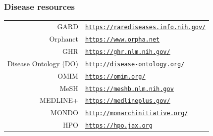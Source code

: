 ﻿\documentclass[anchorcolor=blue,linkcolor=blue]{beamer}
\begin{document}
\begin{frame}
  \frametitle{Disease resources}
  \begin{center}
    \begin{tabular}{rl}
      GARD &
      \href{https://rarediseases.info.nih.gov/}{\texttt{https://rarediseases.info.nih.gov/}}\\
      Orphanet &
      \href{https://www.orpha.net}{\texttt{https://www.orpha.net}}\\
      GHR&
      \href{https://ghr.nlm.nih.gov/}{\texttt{https://ghr.nlm.nih.gov/}}\\
      Disease Ontology (DO) &
      \href{http://disease-ontology.org/}{\texttt{http://disease-ontology.org/}}\\
      OMIM & \href{https://omim.org/}{\texttt{https://omim.org/}}\\
      MeSH &
      \href{https://meshb.nlm.nih.gov}{\texttt{https://meshb.nlm.nih.gov}}\\
      MEDLINE+ &
      \href{https://medlineplus.gov/}{\texttt{https://medlineplus.gov/}}\\
      MONDO &
      \href{http://monarchinitiative.org/}{\texttt{http://monarchinitiative.org/}}\\
      HPO & \href{https://hpo.jax.org}{\texttt{https://hpo.jax.org}}\\
    \end{tabular}
  \end{center}
\end{frame}
\end{document}
